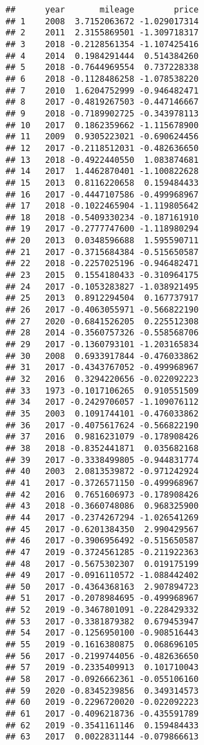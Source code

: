 \documentclass[
]{article}
\begin{document}
\begin{verbatim}
##      year       mileage        price
## 1    2008  3.7152063672 -1.029017314
## 2    2011  2.3155869501 -1.309718317
## 3    2018 -0.2128561354 -1.107425416
## 4    2014  0.1984291444  0.514384260
## 5    2018 -0.7644969554  0.737228338
## 6    2018 -0.1128486258 -1.078538220
## 7    2010  1.6204752999 -0.946482471
## 8    2017 -0.4819267503 -0.447146667
## 9    2018 -0.7189902725 -0.343978113
## 10   2017  0.1862359662 -1.115678900
## 11   2009  0.9305223021 -0.690624456
## 12   2017 -0.2118512031 -0.482636650
## 13   2018 -0.4922440550  1.083874681
## 14   2017  1.4462870401 -1.100822628
## 15   2013  0.8116220658  0.159484433
## 16   2017 -0.4447107586 -0.499968967
## 17   2018 -0.1022465904 -1.119805642
## 18   2018 -0.5409330234 -0.187161910
## 19   2017 -0.2777747600 -1.118980294
## 20   2013  0.0348596688  1.595590711
## 21   2017 -0.3715684384 -0.515650587
## 22   2018 -0.2257025196 -0.946482471
## 23   2015  0.1554180433 -0.310964175
## 24   2017 -0.1053283827 -1.038921495
## 25   2013  0.8912294504  0.167737917
## 26   2017 -0.4063055971 -0.566822190
## 27   2020 -0.6841526205  0.225512308
## 28   2014 -0.3560757326 -0.558568706
## 29   2017 -0.1360793101 -1.203165834
## 30   2008  0.6933917844 -0.476033862
## 31   2017 -0.4343767052 -0.499968967
## 32   2016  0.3294220656 -0.022092223
## 33   1973 -0.1017106265  0.910551509
## 34   2017 -0.2429706057 -1.109076112
## 35   2003  0.1091744101 -0.476033862
## 36   2017 -0.4075617624 -0.566822190
## 37   2016  0.9816231079 -0.178908426
## 38   2018 -0.8352441871  0.035682168
## 39   2017 -0.3338499805 -0.944831774
## 40   2003  2.0813539872 -0.971242924
## 41   2017 -0.3726571150 -0.499968967
## 42   2016  0.7651606973 -0.178908426
## 43   2018 -0.3660748086  0.968325900
## 44   2017 -0.2374267294 -1.026541269
## 45   2017 -0.6201384350  2.990429567
## 46   2017 -0.3906956492 -0.515650587
## 47   2019 -0.3724561285 -0.211922363
## 48   2017 -0.5675302307  0.019175199
## 49   2017 -0.0916110572 -1.088442402
## 50   2017 -0.4364368163  2.907894723
## 51   2017 -0.2078984695 -0.499968967
## 52   2019 -0.3467801091 -0.228429332
## 53   2017 -0.3381879382  0.679453947
## 54   2017 -0.1256950100 -0.908516443
## 55   2019 -0.1616380875  0.068696105
## 56   2017 -0.2199744056 -0.482636650
## 57   2019 -0.2335409913  0.101710043
## 58   2017 -0.0926662361 -0.055106160
## 59   2020 -0.8345239856  0.349314573
## 60   2019 -0.2296720020 -0.022092223
## 61   2017 -0.4096218736 -0.435591789
## 62   2019 -0.3541161146  0.159484433
## 63   2017  0.0022831144 -0.079866613

\end{verbatim}
\end{document}
